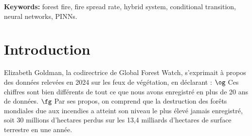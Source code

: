 \documentclass[12pt, oneside]{report} %
\theoremstyle{definition}
\theoremstyle{remark}
\begin{document}
	\vspace{0.3cm}
	
	\textbf{Keywords:} forest fire, fire spread rate, hybrid system, conditional transition, neural networks, PINNs.
	
	
	\cleardoublepage
	
	\clearpage
	\chapter*{Introduction}  
Elizabeth Goldman, la codirectrice de Global Forest Watch, s’exprimait à propos des données relevées en 2024 sur les feux de végétation, en déclarant : $\og$ Ces chiffres sont bien différents de tout ce que nous avons enregistré en plus de 20 ans de données. $\fg$ Par ses propos, on comprend que la destruction des forêts mondiales due aux incendies a atteint son niveau le plus élevé jamais enregistré, soit 30 millions d’hectares perdus sur les 13,4 milliards d’hectares de surface terrestre en une année.
\end{document}
